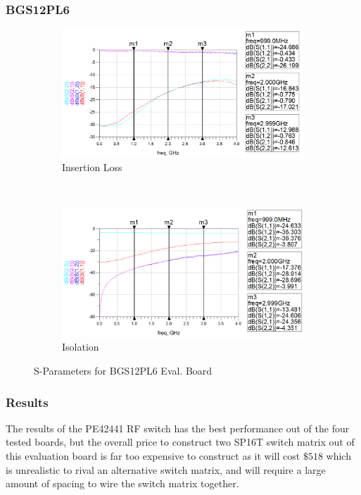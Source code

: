 \documentclass[12pt,openany,a4paper]{book}
\begin{document}
\subsubsection{BGS12PL6}
\begin{figure}[H]
    \centering
    \begin{subfigure}[t]{0.5\textwidth}
        \centering
        \includegraphics[width=1\textwidth]{eval-infineon-spdt.png}
        \caption{Insertion Loss}
        \label{fig:eval-pe42441}
    \end{subfigure}%
    ~ 
    \begin{subfigure}[t]{0.5\textwidth}
        \centering
        \includegraphics[width=1\textwidth]{eval-infineon-spdt-closed.png}
        \caption{Isolation}
    \end{subfigure}
    \caption{S-Parameters for BGS12PL6 Eval. Board}
\end{figure}



\subsubsection{Results} \label{sec:eval-results}
The results of the PE42441 RF switch has the best performance out of the four tested boards, but the overall price to construct two SP16T switch matrix  out of this evaluation board is far too expensive to construct as it will cost $\$518$ which is unrealistic to rival an alternative switch matrix, and will require a large amount of spacing to wire the switch matrix together.
\end{document}
